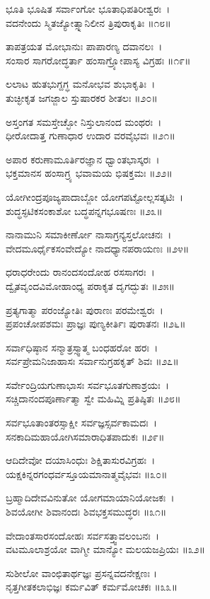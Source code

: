 ಭೂತಿ ಭೂಷಿತ ಸರ್ವಾಂಗೋ ಭೂತಾಧಿಪತಿರೀಶ್ವರಃ~।\\
ವದನೇಂದು ಸ್ಮಿತಜ್ಯೋತ್ಸ್ನಾನಿಲೀನ ತ್ರಿಪುರಾಕೃತಿಃ ॥೧೮॥

	ತಾಪತ್ರಯತ ಮೋಭಾನುಃ ಪಾಪಾರಣ್ಯ ದವಾನಲಃ~।\\
	ಸಂಸಾರ ಸಾಗರೋದ್ಧರ್ತಾ ಹಂಸಾಗ್ರ್ಯೋಪಾಸ್ಯ ವಿಗ್ರಹಃ ॥೧೯॥

ಲಲಾಟ ಹುತಭುಗ್ದಗ್ಧ ಮನೋಭವ ಶುಭಾಕೃತಿಃ~।\\
ತುಚ್ಛೀಕೃತ ಜಗಜ್ಜಾಲ ಸ್ತುಷಾರಕರ ಶೀತಲಃ ॥೨೦॥

	ಅಸ್ತಂಗತ ಸಮಸ್ತೇಚ್ಛೋ ನಿಸ್ತುಲಾನಂದ ಮಂಥರಃ~।\\
	ಧೀರೋದಾತ್ತ ಗುಣಾಧಾರ ಉದಾರ ವರವೈಭವಃ ॥೨೧॥

ಅಪಾರ ಕರುಣಾಮೂರ್ತಿರಜ್ಞಾನ ಧ್ವಾಂತಭಾಸ್ಕರಃ~।\\
ಭಕ್ತಮಾನಸ ಹಂಸಾಗ್ರ್ಯ ಭವಾಮಯ ಭಿಷಕ್ತಮಃ ॥೨೨॥

	ಯೋಗೀಂದ್ರಪೂಜ್ಯಪಾದಾಬ್ಜೋ ಯೋಗಪಟ್ಟೋಲ್ಲಸತ್ಕಟಿಃ~।\\
	ಶುದ್ಧಸ್ಫಟಿಕಸಂಕಾಶೋ ಬದ್ಧಪನ್ನಗಭೂಷಣಃ ॥೨೩॥

ನಾನಾಮುನಿ ಸಮಾಕೀರ್ಣೋ ನಾಸಾಗ್ರನ್ಯಸ್ತಲೋಚನಃ~।\\
ವೇದಮೂರ್ಧೈಕಸಂವೇದ್ಯೋ ನಾದಧ್ಯಾನಪರಾಯಣಃ ॥೨೪॥

	ಧರಾಧರೇಂದು ರಾನಂದಸಂದೋಹ ರಸಸಾಗರಃ~।\\
	ದ್ವೈತವೃಂದವಿಮೋಹಾಂಧ್ಯ ಪರಾಕೃತ ದೃಗದ್ಭುತಃ ॥೨೫॥

ಪ್ರತ್ಯಗಾತ್ಮಾ ಪರಂಜ್ಯೋತಿಃ ಪುರಾಣಃ ಪರಮೇಶ್ವರಃ~।\\
ಪ್ರಪಂಚೋಪಶಮಃ ಪ್ರಾಜ್ಞಃ ಪುಣ್ಯಕೀರ್ತಿಃ ಪುರಾತನಃ ॥೨೬॥

	ಸರ್ವಾಧಿಷ್ಠಾನ ಸನ್ಮಾತ್ರಸ್ಸ್ವಾತ್ಮ ಬಂಧಹರೋ ಹರಃ~।\\
	ಸರ್ವಪ್ರೇಮನಿಜಾಹಾಸಃ ಸರ್ವಾನುಗ್ರಹಕೃತ್ ಶಿವಃ ॥೨೭॥

ಸರ್ವೇಂದ್ರಿಯಗುಣಾಭಾಸಃ ಸರ್ವಭೂತಗುಣಾಶ್ರಯಃ~।\\
ಸಚ್ಚಿದಾನಂದಪೂರ್ಣಾತ್ಮಾ ಸ್ವೇ ಮಹಿಮ್ನಿ ಪ್ರತಿಷ್ಠಿತಃ ॥೨೮॥

	ಸರ್ವಭೂತಾಂತರಸ್ಸಾಕ್ಷೀ ಸರ್ವಜ್ಞಸ್ಸರ್ವಕಾಮದಃ~।\\
	ಸನಕಾದಿಮಹಾಯೋಗಿಸಮಾರಾಧಿತಪಾದುಕಃ ॥೨೯॥

ಆದಿದೇವೋ ದಯಾಸಿಂಧುಃ ಶಿಕ್ಷಿತಾಸುರವಿಗ್ರಹಃ~।\\
ಯಕ್ಷಕಿನ್ನರಗಂಧರ್ವಸ್ತೂಯಮಾನಾತ್ಮವೈಭವಃ ॥೩೦॥

	ಬ್ರಹ್ಮಾದಿದೇವವಿನುತೋ ಯೋಗಮಾಯಾನಿಯೋಜಕಃ~।\\
	ಶಿವಯೋಗೀ ಶಿವಾನಂದಃ ಶಿವಭಕ್ತಸಮುದ್ಧರಃ ॥೩೧॥

ವೇದಾಂತಸಾರಸಂದೋಹಃ ಸರ್ವಸತ್ತ್ವಾವಲಂಬನಃ~।\\
ವಟಮೂಲಾಶ್ರಯೋ ವಾಗ್ಮೀ ಮಾನ್ಯೋ ಮಲಯಜಪ್ರಿಯಃ ॥೩೨॥

	ಸುಶೀಲೋ ವಾಂಛಿತಾರ್ಥಜ್ಞಃ ಪ್ರಸನ್ನವದನೇಕ್ಷಣಃ ।\\
	ನೃತ್ತಗೀತಕಲಾಭಿಜ್ಞಃ ಕರ್ಮವಿತ್ ಕರ್ಮಮೋಚಕಃ ॥೩೩॥

